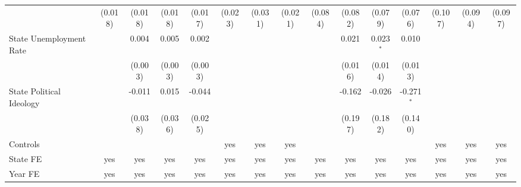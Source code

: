 \documentclass[
]{article}
\begin{document}
\begin{table}[htbp]
\begin{adjustbox}{width = 1.5\textwidth, center}
\begin{threeparttable}[b]
\begin{tabular}{lcccccccccccccc}
                                                      & (0.018)        & (0.018)        & (0.018)        & (0.017)        & (0.023)        & (0.031)        & (0.021)        & (0.084)        & (0.082)        & (0.079)        & (0.076)        & (0.107)        & (0.094)        & (0.097)\\   
            State Unemployment Rate                   &                & 0.004          & 0.005          & 0.002          &                &                &                &                & 0.021          & 0.023$^{*}$    & 0.010          &                &                &   \\   
                                                      &                & (0.003)        & (0.003)        & (0.003)        &                &                &                &                & (0.016)        & (0.014)        & (0.013)        &                &                &   \\   
            State Political Ideology                  &                & -0.011         & 0.015          & -0.044         &                &                &                &                & -0.162         & -0.026         & -0.271$^{*}$   &                &                &   \\   
                                                      &                & (0.038)        & (0.036)        & (0.025)        &                &                &                &                & (0.197)        & (0.182)        & (0.140)        &                &                &   \\   
            \midrule 
            Controls                                  &                &                &                &                & yes            & yes            & yes            &                &                &                &                & yes            & yes            & yes\\  
            State FE                                  & yes            & yes            & yes            & yes            & yes            & yes            & yes            & yes            & yes            & yes            & yes            & yes            & yes            & yes\\  
            Year FE                                   & yes            & yes            & yes            & yes            & yes            & yes            & yes            & yes            & yes            & yes            & yes            & yes            & yes            & yes\\  

\end{tabular}
\end{threeparttable}
\end{adjustbox}
\end{table}
\end{document}
